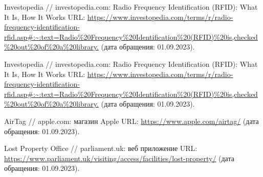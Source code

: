 \documentclass{../mirea}
\begin{document}
\begin{thebibliography}{99\kern\bibindent}
		 Investopedia // investopedia.com: Radio Frequency Identification (RFID): What It Is, How It Works URL: \url{https://www.investopedia.com/terms/r/radio-frequency-identification-rfid.asp#:~:text=Radio%20Frequency%20Identification%20(RFID)%20is,checked%20out%20of%20a%20library.} (дата обращения: 01.09.2023).
		
		 Investopedia // investopedia.com: Radio Frequency Identification (RFID): What It Is, How It Works URL: \url{https://www.investopedia.com/terms/r/radio-frequency-identification-rfid.asp#:~:text=Radio%20Frequency%20Identification%20(RFID)%20is,checked%20out%20of%20a%20library.} (дата обращения: 01.09.2023).
		
		 AirTag // apple.com: магазин Apple URL: \url{https://www.apple.com/airtag/} (дата обращения: 01.09.2023).
		
		 Lost Property Office // parliament.uk: веб приложение URL: \url{https://www.parliament.uk/visiting/access/facilities/lost-property/} (дата обращения: 01.09.2023).
	\end{thebibliography}
	
	
	
	\appendix
	
	
	
\end{document}

